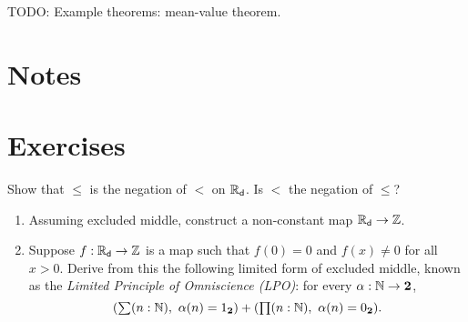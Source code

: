 TODO: Example theorems: mean-value theorem.


\section*{Notes}
\label{sec:reals-notes}

\section*{Exercises}
\label{sec:reals-exercises}

\begin{ex}
  Show that $\leq$ is the negation of $<$ on $\mathbb{R}_\mathsf{d}$. Is $<$ the negation of $\leq$?
\end{ex}


\begin{ex} \label{ex:reals-non-constant-into-Z}
  \mbox{}
  \begin{enumerate}
  \item Assuming excluded middle, construct a non-constant map $\mathbb{R}_\mathsf{d} \to \mathbb{Z}$.
  \item Suppose $f : \mathbb{R}_\mathsf{d} \to \mathbb{Z}$ is a map such that $f(0) = 0$ and $f(x) \neq 0$ for all
    $x > 0$. Derive from this the following limited form of excluded middle, known as the
    \emph{Limited Principle of Omniscience (LPO)}: for every $\alpha : \mathbb{N} \to \mathbf{2}$,
    \begin{equation*}
      (\sm{n : \N} \alpha(n) = \btrue) + (\prd{n : \N} \alpha(n) = \bfalse).
    \end{equation*}
  \end{enumerate}
\end{ex}



